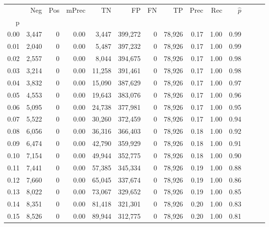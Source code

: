 \begin{tabular}{rrrrrrrrrrrrrr}
\toprule
{} &    Neg &    Pos & mPrec &       TN &       FP &      FN &      TP &  Prec &   Rec & $\hat{p}$ \\
p    &        &        &       &          &          &         &         &       &       &           \\
\midrule
0.00 &  3,447 &      0 &  0.00 &    3,447 &  399,272 &       0 &  78,926 &  0.17 &  1.00 &      0.99 \\
0.01 &  2,040 &      0 &  0.00 &    5,487 &  397,232 &       0 &  78,926 &  0.17 &  1.00 &      0.99 \\
0.02 &  2,557 &      0 &  0.00 &    8,044 &  394,675 &       0 &  78,926 &  0.17 &  1.00 &      0.98 \\
0.03 &  3,214 &      0 &  0.00 &   11,258 &  391,461 &       0 &  78,926 &  0.17 &  1.00 &      0.98 \\
0.04 &  3,832 &      0 &  0.00 &   15,090 &  387,629 &       0 &  78,926 &  0.17 &  1.00 &      0.97 \\
0.05 &  4,553 &      0 &  0.00 &   19,643 &  383,076 &       0 &  78,926 &  0.17 &  1.00 &      0.96 \\
0.06 &  5,095 &      0 &  0.00 &   24,738 &  377,981 &       0 &  78,926 &  0.17 &  1.00 &      0.95 \\
0.07 &  5,522 &      0 &  0.00 &   30,260 &  372,459 &       0 &  78,926 &  0.17 &  1.00 &      0.94 \\
0.08 &  6,056 &      0 &  0.00 &   36,316 &  366,403 &       0 &  78,926 &  0.18 &  1.00 &      0.92 \\
0.09 &  6,474 &      0 &  0.00 &   42,790 &  359,929 &       0 &  78,926 &  0.18 &  1.00 &      0.91 \\
0.10 &  7,154 &      0 &  0.00 &   49,944 &  352,775 &       0 &  78,926 &  0.18 &  1.00 &      0.90 \\
0.11 &  7,441 &      0 &  0.00 &   57,385 &  345,334 &       0 &  78,926 &  0.19 &  1.00 &      0.88 \\
0.12 &  7,660 &      0 &  0.00 &   65,045 &  337,674 &       0 &  78,926 &  0.19 &  1.00 &      0.86 \\
0.13 &  8,022 &      0 &  0.00 &   73,067 &  329,652 &       0 &  78,926 &  0.19 &  1.00 &      0.85 \\
0.14 &  8,351 &      0 &  0.00 &   81,418 &  321,301 &       0 &  78,926 &  0.20 &  1.00 &      0.83 \\
0.15 &  8,526 &      0 &  0.00 &   89,944 &  312,775 &       0 &  78,926 &  0.20 &  1.00 &      0.81 \\

\end{tabular}
